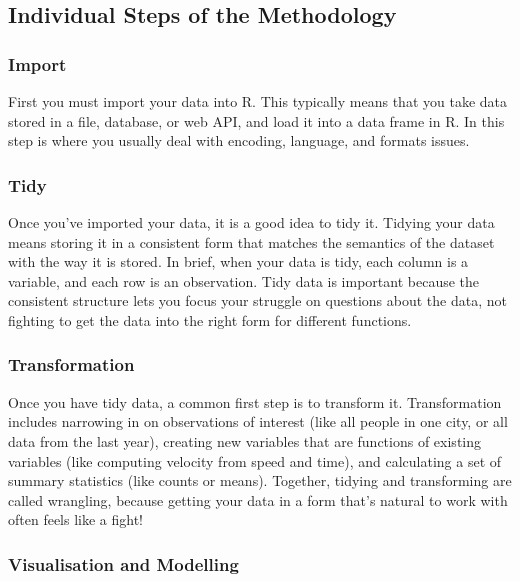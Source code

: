 \documentclass[]{book}
\begin{document}
\subsection{Individual Steps of the
Methodology}\label{individual-steps-of-the-methodology}

\subsubsection{Import}\label{import}

First you must import your data into R. This typically means that you
take data stored in a file, database, or web API, and load it into a
data frame in R. In this step is where you usually deal with encoding,
language, and formats issues.

\subsubsection{Tidy}\label{tidy}

Once you've imported your data, it is a good idea to tidy it. Tidying
your data means storing it in a consistent form that matches the
semantics of the dataset with the way it is stored. In brief, when your
data is tidy, each column is a variable, and each row is an observation.
Tidy data is important because the consistent structure lets you focus
your struggle on questions about the data, not fighting to get the data
into the right form for different functions.

\subsubsection{Transformation}\label{transformation}

Once you have tidy data, a common first step is to transform it.
Transformation includes narrowing in on observations of interest (like
all people in one city, or all data from the last year), creating new
variables that are functions of existing variables (like computing
velocity from speed and time), and calculating a set of summary
statistics (like counts or means). Together, tidying and transforming
are called wrangling, because getting your data in a form that's natural
to work with often feels like a fight!

\subsubsection{Visualisation and
Modelling}\label{visualisation-and-modelling}
\end{document}
